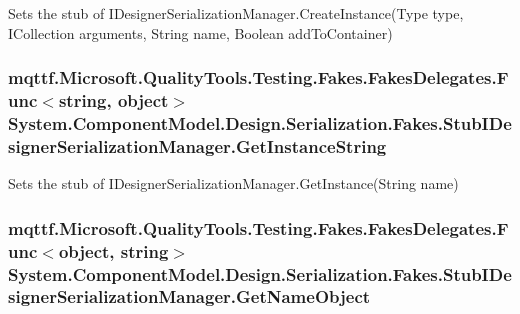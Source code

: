 Sets the stub of I\-Designer\-Serialization\-Manager.\-Create\-Instance(\-Type type, I\-Collection arguments, String name, Boolean add\-To\-Container)

\hypertarget{class_system_1_1_component_model_1_1_design_1_1_serialization_1_1_fakes_1_1_stub_i_designer_serialization_manager_a1d55ff6d23ff3062e16e4dc86af507ac}{
\subsubsection[{Get\-Instance\-String}]{\setlength{\rightskip}{0pt plus 5cm}mqttf.\-Microsoft.\-Quality\-Tools.\-Testing.\-Fakes.\-Fakes\-Delegates.\-Func$<$string, object$>$ System.\-Component\-Model.\-Design.\-Serialization.\-Fakes.\-Stub\-I\-Designer\-Serialization\-Manager.\-Get\-Instance\-String}}\label{class_system_1_1_component_model_1_1_design_1_1_serialization_1_1_fakes_1_1_stub_i_designer_serialization_manager_a1d55ff6d23ff3062e16e4dc86af507ac}


Sets the stub of I\-Designer\-Serialization\-Manager.\-Get\-Instance(\-String name)

\hypertarget{class_system_1_1_component_model_1_1_design_1_1_serialization_1_1_fakes_1_1_stub_i_designer_serialization_manager_afd4daeeaee221b0c6d546aaf15fe93b0}{
\subsubsection[{Get\-Name\-Object}]{\setlength{\rightskip}{0pt plus 5cm}mqttf.\-Microsoft.\-Quality\-Tools.\-Testing.\-Fakes.\-Fakes\-Delegates.\-Func$<$object, string$>$ System.\-Component\-Model.\-Design.\-Serialization.\-Fakes.\-Stub\-I\-Designer\-Serialization\-Manager.\-Get\-Name\-Object}}\label{class_system_1_1_component_model_1_1_design_1_1_serialization_1_1_fakes_1_1_stub_i_designer_serialization_manager_afd4daeeaee221b0c6d546aaf15fe93b0}


